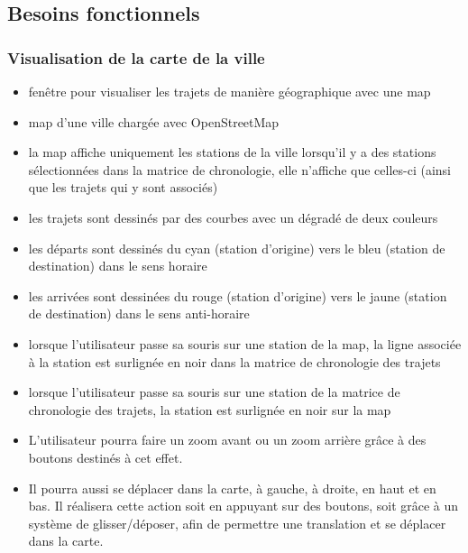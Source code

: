 \documentclass[12pt]{article}
\begin{document}
		\subsection{Besoins fonctionnels}
			\subsubsection{Visualisation de la carte de la ville}
				\begin{itemize}
					\item fenêtre pour visualiser les trajets de manière géographique avec une map
					\item map d'une ville chargée avec OpenStreetMap
					\item la map affiche uniquement les stations de la ville lorsqu'il y a des stations sélectionnées dans la matrice de chronologie, elle n'affiche que celles-ci (ainsi que les trajets qui y sont associés)
					\item les trajets sont dessinés par des courbes avec un dégradé de deux couleurs
					\item les départs sont dessinés du cyan (station d'origine) vers le bleu (station de destination) dans le sens horaire
					\item les arrivées sont dessinées du rouge (station d'origine) vers le jaune (station de destination) dans le sens anti-horaire
					\item lorsque l'utilisateur passe sa souris sur une station de la map, la ligne associée à la station est surlignée en noir dans la matrice de chronologie des trajets
					\item lorsque l'utilisateur passe sa souris sur une station de la matrice de chronologie des trajets, la station est surlignée en noir sur la map
					\item L'utilisateur pourra faire un zoom avant ou un zoom arrière grâce à des boutons destinés à cet effet.
					\item Il pourra aussi se déplacer dans la carte, à gauche, à droite, en haut et en bas. Il réalisera cette action soit en appuyant sur des boutons, soit grâce à un système de glisser/déposer, afin de permettre une translation et se déplacer dans la carte.
				\end{itemize}
\end{document}
